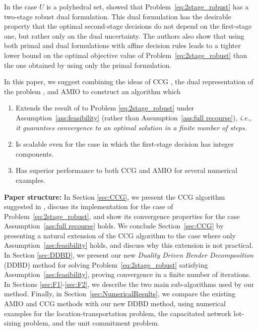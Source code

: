 \documentclass[12pt,x11names]{article}
\theoremstyle{definition}
\begin{document}
In the case $U$ is a polyhedral set,
\citet{Bertsimas2015} showed that Problem~\eqref{eq:2stage_robust} has a two-stage robust dual formulation. This dual formulation has the desirable property that the optimal second-stage decisions do not depend on the first-stage one, but rather only on the dual uncertainty. The authors also show that using both primal and dual formulations with affine decision rules leads to a tighter lower bound on the optimal objective value of Problem~\eqref{eq:2stage_robust} than the one obtained by using only the primal formulation. 

In this paper, we suggest combining the ideas of CCG \citep{Zeng2013}, the dual representation of the problem \citep{Bertsimas2015}, and AMIO \citep{BertsimasDunning2014} to construct an algorithm which
\begin{enumerate}
\item Extends the result of \citet{Zeng2013} to Problem \eqref{eq:2stage_robust} under Assumption~\ref{ass:feasibility} (rather than Assumption~\ref{ass:full recourse}), \it{i.e.}, it guarantees convergence to an optimal solution in a finite number of steps.
\item Is scalable even for the case in which the first-stage decision has integer components.
\item Has superior performance to both CCG and AMIO for several numerical examples.
\end{enumerate}

{\noindent \bf Paper structure:}
In Section \ref{sec:CCG}, we present the CCG algorithm suggested in \citep{Zeng2013}, discuss its implementation for the case of Problem~\eqref{eq:2stage_robust}, and show its convergence properties for the case Assumption~\ref{ass:full recourse} holds. We conclude Section~\ref{sec:CCG} by presenting a natural extension of the CCG algorithm to the case where only Assumption~\ref{ass:feasibility} holds, and discuss why this extension is not practical. In Section
\ref{sec:DDBD}, we present our new \emph{Duality Driven Bender Decomposition} (DDBD) method for solving Problem~\eqref{eq:2stage_robust} satisfying Assumption~\ref{ass:feasibility}, proving convergence in a finite number of iterations. In Sections \ref{sec:F1}-\ref{sec:F2}, we describe the two main sub-algorithms used by our method.
Finally, in Section~\ref{sec:NumericalResults}, we compare the existing AMIO and CCG methods with our new DDBD method, using numerical examples for the location-transportation problem, the capacitated network lot-sizing problem,  and the unit commitment problem.
\end{document}
